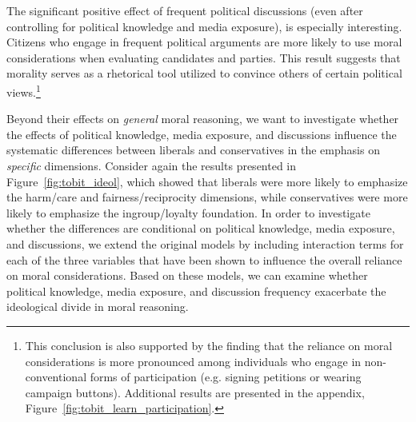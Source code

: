 \documentclass[12pt]{article}
\begin{document}
The significant positive effect of frequent political discussions (even after controlling for political knowledge and media exposure), is especially interesting. Citizens who engage in frequent political arguments are more likely to use moral considerations when evaluating candidates and parties. This result suggests that morality serves as a rhetorical tool utilized to convince others of certain political views.\footnote{This conclusion is also supported by the finding that the reliance on moral considerations is more pronounced among individuals who engage in non-conventional forms of participation (e.g. signing petitions or wearing campaign buttons). Additional results are presented in the appendix, Figure~\ref{fig:tobit_learn_participation}.}

Beyond their effects on \textit{general} moral reasoning, we want to investigate whether the effects of political knowledge, media exposure, and discussions influence the systematic differences between liberals and conservatives in the emphasis on \textit{specific} dimensions. Consider again the results presented in Figure~\ref{fig:tobit_ideol}, which showed that liberals were more likely to emphasize the harm/care and fairness/reciprocity dimensions, while conservatives were more likely to emphasize the ingroup/loyalty foundation. In order to investigate whether the differences are conditional on political knowledge, media exposure, and discussions, we extend the original models by including interaction terms for each of the three variables that have been shown to influence the overall reliance on moral considerations. Based on these models, we can examine whether political knowledge, media exposure, and discussion frequency exacerbate the ideological divide in moral reasoning.
\end{document}
